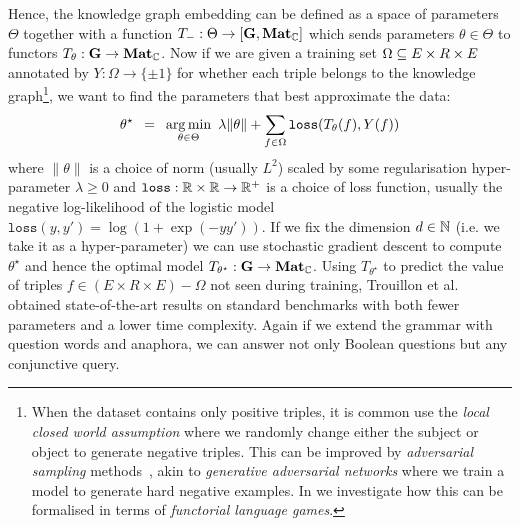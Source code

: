 Hence, the knowledge graph embedding can be defined as a space of parameters $\Theta$ together with a function $T_- : \Theta \to [\mathbf{G}, \mathbf{Mat}_{\mathbb{C}}]$ which sends parameters $\theta \in \Theta$ to functors $T_\theta : \mathbf{G} \to \mathbf{Mat}_{\mathbb{C}}$.
Now if we are given a training set $\Omega \subseteq E \times R \times E$ annotated by $Y : \Omega \to \{ \pm 1 \}$ for whether each triple belongs to the knowledge graph\footnote
{When the dataset contains only positive triples, it is common use the \emph{local closed world assumption} where we randomly change either the subject or object to generate negative triples.
This can be improved by \emph{adversarial sampling} methods~\cite{CaiWang18}, akin to \emph{generative adversarial networks} where we train a model to generate hard negative examples.
In \cite{FeliceEtAl20} we investigate how this can be formalised in terms of \emph{functorial language games}.},
we want to find the parameters that best approximate the data:
$$
\theta^\star \enspace = \enspace \operatorname*{arg\,min}_{\theta \in \Theta} \
\lambda \lVert \theta \rVert + \sum_{f \in \Omega} \mathtt{loss}(T_\theta(f), Y(f))
$$
where $\lVert \theta \rVert$ is a choice of norm (usually $L^2$) scaled by some regularisation hyper-parameter $\lambda \geq 0$ and $\mathtt{loss} : \mathbb{R} \times \mathbb{R} \to \mathbb{R}^+$ is a choice of loss function, usually the negative log-likelihood of the logistic model $\mathtt{loss}(y, y') = \log (1 + \exp(-yy'))$.
If we fix the dimension $d \in \mathbb{N}$ (i.e. we take it as a hyper-parameter) we can use stochastic gradient descent to compute $\theta^\star$ and hence the optimal model $T_{\theta^\star} : \mathbf{G} \to \mathbf{Mat}_{\mathbb{C}}$.
Using $T_{\theta^\star}$ to predict the value of triples $f \in (E \times R \times E) - \Omega$ not seen during training, Trouillon et al. obtained state-of-the-art results on standard benchmarks with both fewer parameters and a lower time complexity.
Again if we extend the grammar with question words and anaphora, we can answer not only Boolean questions but any conjunctive query.

